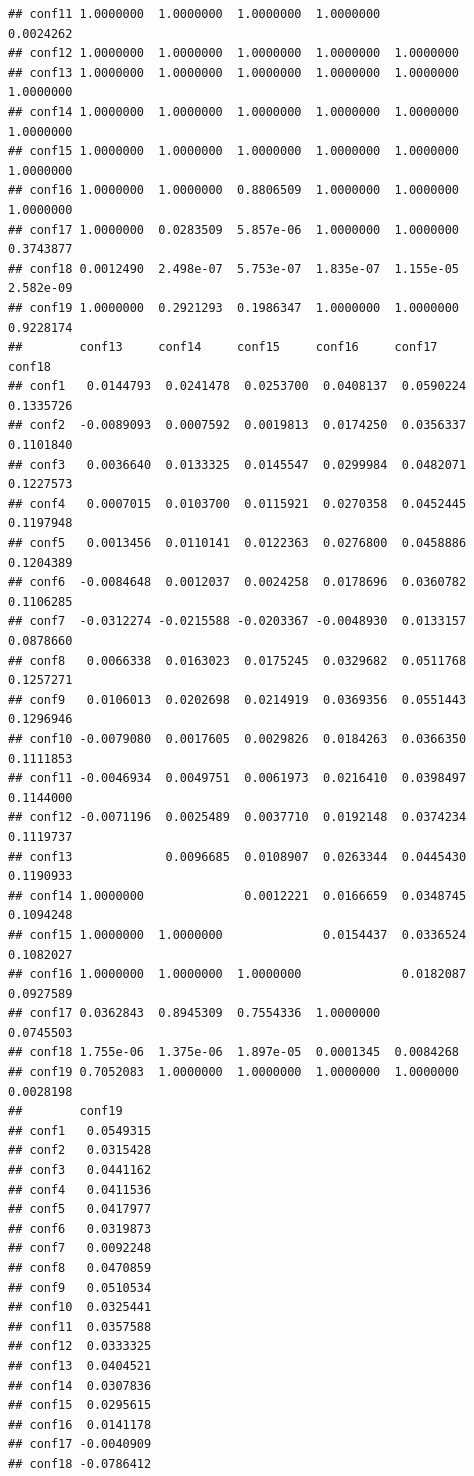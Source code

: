 \documentclass[
]{article}
\begin{document}
\begin{verbatim}
## conf11 1.0000000  1.0000000  1.0000000  1.0000000              0.0024262
## conf12 1.0000000  1.0000000  1.0000000  1.0000000  1.0000000            
## conf13 1.0000000  1.0000000  1.0000000  1.0000000  1.0000000  1.0000000 
## conf14 1.0000000  1.0000000  1.0000000  1.0000000  1.0000000  1.0000000 
## conf15 1.0000000  1.0000000  1.0000000  1.0000000  1.0000000  1.0000000 
## conf16 1.0000000  1.0000000  0.8806509  1.0000000  1.0000000  1.0000000 
## conf17 1.0000000  0.0283509  5.857e-06  1.0000000  1.0000000  0.3743877 
## conf18 0.0012490  2.498e-07  5.753e-07  1.835e-07  1.155e-05  2.582e-09 
## conf19 1.0000000  0.2921293  0.1986347  1.0000000  1.0000000  0.9228174 
##        conf13     conf14     conf15     conf16     conf17     conf18    
## conf1   0.0144793  0.0241478  0.0253700  0.0408137  0.0590224  0.1335726
## conf2  -0.0089093  0.0007592  0.0019813  0.0174250  0.0356337  0.1101840
## conf3   0.0036640  0.0133325  0.0145547  0.0299984  0.0482071  0.1227573
## conf4   0.0007015  0.0103700  0.0115921  0.0270358  0.0452445  0.1197948
## conf5   0.0013456  0.0110141  0.0122363  0.0276800  0.0458886  0.1204389
## conf6  -0.0084648  0.0012037  0.0024258  0.0178696  0.0360782  0.1106285
## conf7  -0.0312274 -0.0215588 -0.0203367 -0.0048930  0.0133157  0.0878660
## conf8   0.0066338  0.0163023  0.0175245  0.0329682  0.0511768  0.1257271
## conf9   0.0106013  0.0202698  0.0214919  0.0369356  0.0551443  0.1296946
## conf10 -0.0079080  0.0017605  0.0029826  0.0184263  0.0366350  0.1111853
## conf11 -0.0046934  0.0049751  0.0061973  0.0216410  0.0398497  0.1144000
## conf12 -0.0071196  0.0025489  0.0037710  0.0192148  0.0374234  0.1119737
## conf13             0.0096685  0.0108907  0.0263344  0.0445430  0.1190933
## conf14 1.0000000              0.0012221  0.0166659  0.0348745  0.1094248
## conf15 1.0000000  1.0000000              0.0154437  0.0336524  0.1082027
## conf16 1.0000000  1.0000000  1.0000000              0.0182087  0.0927589
## conf17 0.0362843  0.8945309  0.7554336  1.0000000              0.0745503
## conf18 1.755e-06  1.375e-06  1.897e-05  0.0001345  0.0084268            
## conf19 0.7052083  1.0000000  1.0000000  1.0000000  1.0000000  0.0028198 
##        conf19    
## conf1   0.0549315
## conf2   0.0315428
## conf3   0.0441162
## conf4   0.0411536
## conf5   0.0417977
## conf6   0.0319873
## conf7   0.0092248
## conf8   0.0470859
## conf9   0.0510534
## conf10  0.0325441
## conf11  0.0357588
## conf12  0.0333325
## conf13  0.0404521
## conf14  0.0307836
## conf15  0.0295615
## conf16  0.0141178
## conf17 -0.0040909
## conf18 -0.0786412

\end{verbatim}
\end{document}
